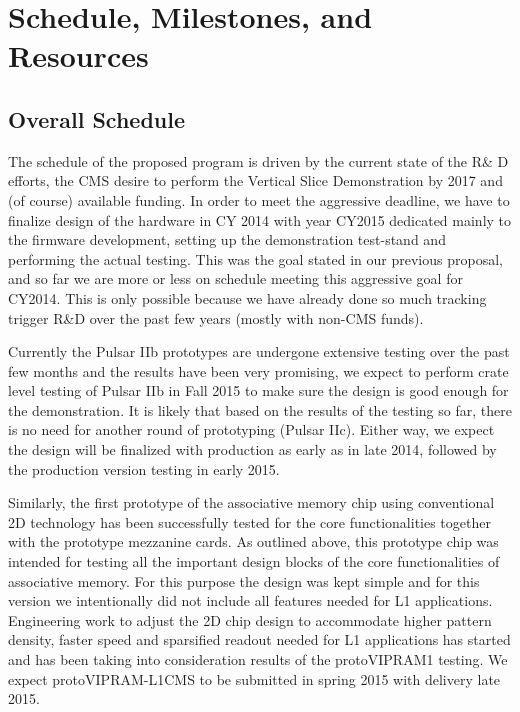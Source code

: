 \section{Schedule, Milestones, and Resources}
\subsection{Overall Schedule}

The schedule of the proposed program is driven by the current state of the R\& D efforts, the CMS desire to perform the Vertical Slice Demonstration by 2017 and (of course) available funding.  In order to meet the aggressive deadline, we have to finalize design of the hardware in CY 2014 with year CY2015 dedicated mainly to the firmware development, setting up the demonstration test-stand and performing the actual testing. This was the goal stated in our previous proposal, and so far we are more or less on schedule meeting this aggressive goal for CY2014. This is only possible because we have already done so much tracking trigger R\&D over the past few years (mostly with non-CMS funds). 

Currently the Pulsar IIb prototypes are undergone extensive testing over the past few months and the results have been very promising, we expect to perform crate level testing of Pulsar IIb in Fall 2015 to make sure the design is good enough for the demonstration. It is likely that based on the results of the testing so far, there is no need for another round of prototyping (Pulsar IIc). Either way, we expect the design will be finalized with production as early as in late 2014, followed by the production version testing in early 2015. 

Similarly, the first prototype of the associative memory chip using conventional 2D technology has been successfully tested for the core functionalities together with the prototype mezzanine cards. 
As outlined above, this prototype chip was intended for testing all the important design blocks of the core functionalities of associative memory. For this purpose the design was kept simple and for this version we intentionally did not include all features needed for L1 applications. Engineering work to adjust the 2D chip design to accommodate higher pattern density, faster speed and sparsified readout needed for L1 applications has started and has been taking into consideration results of the protoVIPRAM1 testing. We expect protoVIPRAM-L1CMS to be submitted in spring 2015 with delivery late 2015.

